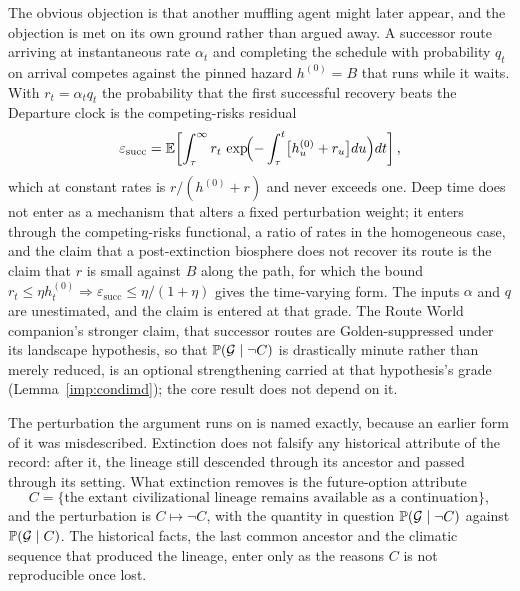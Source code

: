 The obvious objection is that another muffling agent might later
appear, and the objection is met on its own ground rather than argued
away. A successor route arriving at instantaneous rate $\alpha_t$ and
completing the schedule with probability $q_t$ on arrival competes
against the pinned hazard $h^{(0)}=B$ that runs while it waits.
With $r_t=\alpha_tq_t$ the probability that the first successful
recovery beats the Departure clock is the competing-risks residual
\begin{equation}\label{eq:epssucc}
\varepsilon_{\mathrm{succ}}
=\mathbb{E}\!\left[\int_\tau^\infty r_t\,\exp\!\Bigl(-\int_\tau^t\bigl[h^{(0)}_u+r_u\bigr]du\Bigr)dt\right],
\end{equation}
which at constant rates is $r/(h^{(0)}+r)$ and never exceeds one. Deep
time does not enter as a mechanism that alters a fixed perturbation
weight; it enters through the competing-risks functional, a ratio of
rates in the homogeneous case, and the claim that a post-extinction
biosphere does not recover its route is the claim that $r$ is small
against $B$ along the path, for which the bound
$r_t\le\eta h^{(0)}_t\Rightarrow\varepsilon_{\mathrm{succ}}\le\eta/(1+\eta)$
gives the time-varying form. The inputs $\alpha$ and $q$ are
unestimated, and the claim is entered at that grade. The Route World
companion's stronger claim, that successor routes are Golden-suppressed
under its landscape hypothesis, so that $\mathbb{P}(\mathcal G\mid\neg C)$ is
drastically minute rather than merely reduced, is an optional
strengthening carried at that hypothesis's grade
(Lemma~\ref{imp:condimd}); the core result does not depend on it.

The perturbation the argument runs on is named exactly, because an
earlier form of it was misdescribed. Extinction does not falsify any
historical attribute of the record: after it, the lineage still
descended through its ancestor and passed through its setting. What
extinction removes is the future-option attribute
\[
C=\{\text{the extant civilizational lineage remains available as a continuation}\},
\]
and the perturbation is $C\mapsto\neg C$, with the quantity in question
$\mathbb{P}(\mathcal G\mid\neg C)$ against $\mathbb{P}(\mathcal G\mid C)$. The
historical facts, the last common ancestor and the climatic sequence
that produced the lineage, enter only as the reasons $C$ is not
reproducible once lost.

